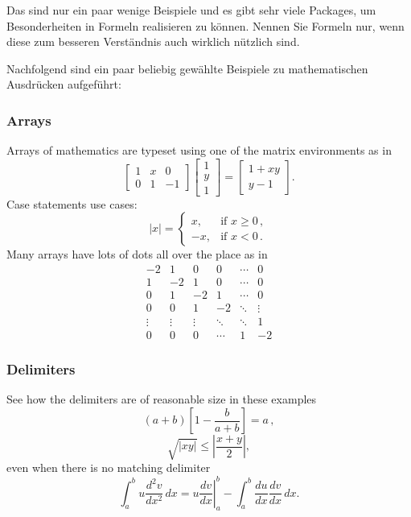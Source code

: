 Das sind nur ein paar wenige Beispiele und es gibt sehr viele Packages, um Besonderheiten in Formeln realisieren zu können. Nennen Sie Formeln nur, wenn diese zum besseren Verständnis auch wirklich nützlich sind.

Nachfolgend sind ein paar beliebig gewählte Beispiele zu mathematischen Ausdrücken aufgeführt:

\subsubsection{Arrays}

Arrays of mathematics are typeset using one of the matrix environments as 
in
\[
\begin{bmatrix}
1 & x & 0 \\
0 & 1 & -1
\end{bmatrix}\begin{bmatrix}
1  \\
y  \\
1
\end{bmatrix}
=\begin{bmatrix}
1+xy  \\
y-1
\end{bmatrix}.
\]
Case statements use cases:
\[
|x|=\begin{cases}
x, & \text{if }x\geq 0\,,  \\
-x, & \text{if }x< 0\,.
\end{cases}
\]
Many arrays have lots of dots all over the place as in
\[
\begin{matrix}
-2 & 1 & 0 & 0 & \cdots & 0  \\
1 & -2 & 1 & 0 & \cdots & 0  \\
0 & 1 & -2 & 1 & \cdots & 0  \\
0 & 0 & 1 & -2 & \ddots & \vdots \\
\vdots & \vdots & \vdots & \ddots & \ddots & 1  \\
0 & 0 & 0 & \cdots & 1 & -2
\end{matrix}
\]

\subsubsection{Delimiters}

See how the delimiters are of reasonable size in these examples
\[
\left(a+b\right)\left[1-\frac{b}{a+b}\right]=a\,,
\]
\[
\sqrt{|xy|}\leq\left|\frac{x+y}{2}\right|,
\]
even when there is no matching delimiter
\[
\int_a^bu\frac{d^2v}{dx^2}\,dx
=\left.u\frac{dv}{dx}\right|_a^b
-\int_a^b\frac{du}{dx}\frac{dv}{dx}\,dx.
\]






